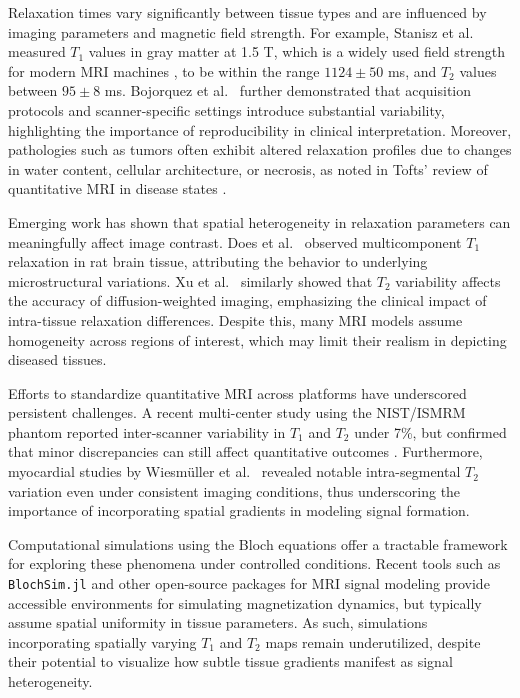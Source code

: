 \documentclass[10pt,a4paper,twoside]{article}
\begin{document}
Relaxation times vary significantly between tissue types and are influenced by imaging parameters and magnetic field strength. For example, Stanisz et al.\ \cite{stanisz2005} measured \( T_1 \) values in gray matter at 1.5 T, which is a widely used field strength for modern MRI machines \cite{brown2014}, to be within the range $1124 \pm 50$ ms, and \( T_2 \) values between $95 \pm 8$ ms. Bojorquez et al.\ \cite{bojorquez2017} further demonstrated that acquisition protocols and scanner-specific settings introduce substantial variability, highlighting the importance of reproducibility in clinical interpretation. Moreover, pathologies such as tumors often exhibit altered relaxation profiles due to changes in water content, cellular architecture, or necrosis, as noted in Tofts' review of quantitative MRI in disease states \cite{tofts2003}.

Emerging work has shown that spatial heterogeneity in relaxation parameters can meaningfully affect image contrast. Does et al.\ \cite{does2002} observed multicomponent \( T_1 \) relaxation in rat brain tissue, attributing the behavior to underlying microstructural variations. Xu et al.\ \cite{xu2009} similarly showed that \( T_2 \) variability affects the accuracy of diffusion-weighted imaging, emphasizing the clinical impact of intra-tissue relaxation differences. Despite this, many MRI models assume homogeneity across regions of interest, which may limit their realism in depicting diseased tissues.

Efforts to standardize quantitative MRI across platforms have underscored persistent challenges. A recent multi-center study using the NIST/ISMRM phantom reported inter-scanner variability in \( T_1 \) and \( T_2 \) under 7\%, but confirmed that minor discrepancies can still affect quantitative outcomes \cite{pasini2025}. Furthermore, myocardial studies by Wiesmüller et al.\ \cite{wiesmueller2020} revealed notable intra-segmental \( T_2 \) variation even under consistent imaging conditions, thus underscoring the importance of incorporating spatial gradients in modeling signal formation.

Computational simulations using the Bloch equations offer a tractable framework for exploring these phenomena under controlled conditions. Recent tools such as \texttt{BlochSim.jl} \cite{blochsim} and other open-source packages for MRI signal modeling provide accessible environments for simulating magnetization dynamics, but typically assume spatial uniformity in tissue parameters. As such, simulations incorporating spatially varying \( T_1 \) and \( T_2 \) maps remain underutilized, despite their potential to visualize how subtle tissue gradients manifest as signal heterogeneity.
\end{document}
